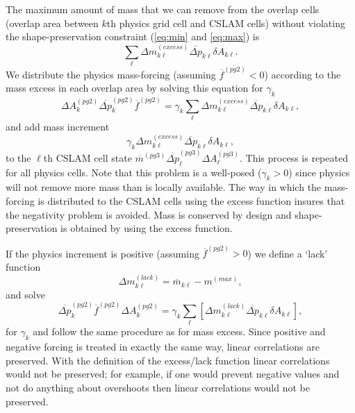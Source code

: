 The maximum amount of mass that we can remove from the overlap cells (overlap area between $k$th physics grid cell and CSLAM cells) without violating the shape-preservation constraint (\eqref{eq:min} and \eqref{eq:max}) is
\begin{equation}
\sum_\ell \Delta m^{(excess)}_{k\ell}\overline{\Delta p}_{k\ell} \delta A_{k\ell}.
\end{equation}
We distribute the physics mass-forcing (assuming ${\overline{f}}^{(pg2)}<0$) according to the mass excess in each overlap area by solving this equation for $\gamma_k$
\begin{equation}
\Delta A_k^{(pg2)}\overline{\Delta p}_k^{(pg2)}{\overline{f}}^{(pg2)}=\gamma_k \sum_\ell \Delta m^{(excess)}_{k\ell}\overline{\Delta p}_{k\ell} \delta A_{k\ell},
\end{equation}
and add mass increment {\color{red}{[check signs!]}}
\begin{equation}
\gamma_k \Delta m^{(excess)}_{k\ell}\overline{\Delta p}_{k\ell} \delta A_{k\ell},
\end{equation}
to the $\ell$th CSLAM cell state ${\overline{m}}^{(pg3)} \overline{\Delta p}^{(pg3)}_\ell \Delta A^{(pg3)}_\ell$. This process is repeated for all physics cells. Note that this problem is a well-posed ($\gamma_k>0$) since physics will not remove more mass than is locally available. The way in which the mass-forcing is distributed to the CSLAM cells using the excess function insures that the negativity problem is avoided. Mass is conserved by design and shape-preservation is obtained by using the excess function.

If the physics increment is positive (assuming ${\overline{f}}^{(pg2)}>0$) we define a `lack' function
\begin{equation}
\Delta m^{(lack)}_{k\ell}=\overline{m}_{k\ell}-m^{(max)},
\end{equation}
and solve
\begin{equation}
\overline{\Delta p}_k^{(pg2)}{\overline{f}}^{(pg2)}\Delta A_k^{(pg2)}=\gamma_k \sum_\ell \left[ \Delta m^{(lack)}_{k\ell}\overline{\Delta p}_{k\ell} \delta A_{k\ell}\right],
\end{equation}
for $\gamma_k$ and follow the same procedure as for mass excess. Since positive and negative forcing is treated in exactly the same way, linear correlations are preserved. With the definition of the excess/lack function linear correlations would not be preserved; for example, if one would prevent negative values and not do anything about overshoots then linear correlations would not be preserved.

